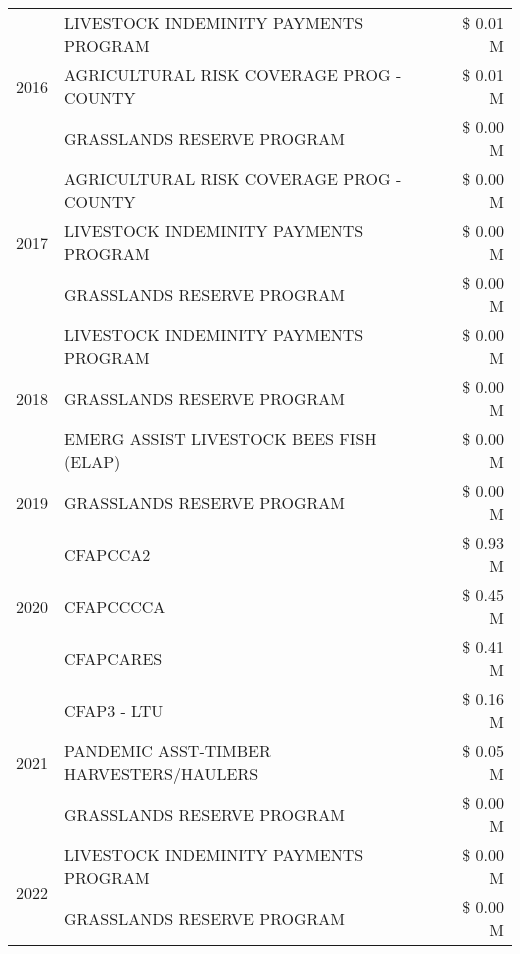 \begin{tabular}{llr}
\cline{1-3}
\multirow[t]{3}{*}{2016} & LIVESTOCK INDEMINITY PAYMENTS PROGRAM & \$ 0.01 M \\
 & AGRICULTURAL RISK COVERAGE PROG - COUNTY & \$ 0.01 M \\
 & GRASSLANDS RESERVE PROGRAM & \$ 0.00 M \\
\cline{1-3}
\multirow[t]{3}{*}{2017} & AGRICULTURAL RISK COVERAGE PROG - COUNTY & \$ 0.00 M \\
 & LIVESTOCK INDEMINITY PAYMENTS PROGRAM & \$ 0.00 M \\
 & GRASSLANDS RESERVE PROGRAM & \$ 0.00 M \\
\cline{1-3}
\multirow[t]{3}{*}{2018} & LIVESTOCK INDEMINITY PAYMENTS PROGRAM & \$ 0.00 M \\
 & GRASSLANDS RESERVE PROGRAM & \$ 0.00 M \\
 & EMERG ASSIST LIVESTOCK BEES FISH (ELAP) & \$ 0.00 M \\
\cline{1-3}
2019 & GRASSLANDS RESERVE PROGRAM & \$ 0.00 M \\
\cline{1-3}
\multirow[t]{3}{*}{2020} & CFAPCCA2 & \$ 0.93 M \\
 & CFAPCCCCA & \$ 0.45 M \\
 & CFAPCARES & \$ 0.41 M \\
\cline{1-3}
\multirow[t]{3}{*}{2021} & CFAP3 - LTU & \$ 0.16 M \\
 & PANDEMIC ASST-TIMBER HARVESTERS/HAULERS & \$ 0.05 M \\
 & GRASSLANDS RESERVE PROGRAM & \$ 0.00 M \\
\cline{1-3}
\multirow[t]{2}{*}{2022} & LIVESTOCK INDEMINITY PAYMENTS PROGRAM & \$ 0.00 M \\
 & GRASSLANDS RESERVE PROGRAM & \$ 0.00 M \\
\cline{1-3}
\bottomrule
\end{tabular}
